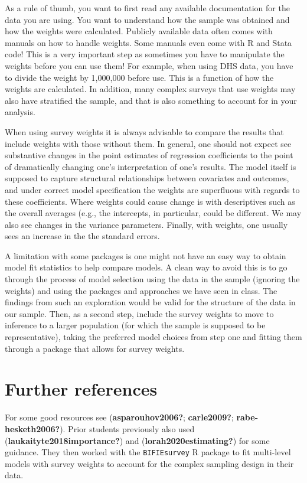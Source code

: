 \documentclass[
  letterpaper,
  DIV=11,
  numbers=noendperiod]{scrreprt}
\begin{document}
As a rule of thumb, you want to first read any available documentation
for the data you are using. You want to understand how the sample was
obtained and how the weights were calculated. Publicly available data
often comes with manuals on how to handle weights. Some manuals even
come with R and Stata code! This is a very important step as sometimes
you have to manipulate the weights before you can use them! For example,
when using DHS data, you have to divide the weight by 1,000,000 before
use. This is a function of how the weights are calculated. In addition,
many complex surveys that use weights may also have stratified the
sample, and that is also something to account for in your analysis.

When using survey weights it is always advisable to compare the results
that include weights with those without them. In general, one should not
expect see substantive changes in the point estimates of regression
coefficients to the point of dramatically changing one's interpretation
of one's results. The model itself is supposed to capture structural
relationships between covariates and outcomes, and under correct model
specification the weights are superfluous with regards to these
coefficients. Where weights could cause change is with descriptives such
as the overall averages (e.g., the intercepts, in particular, could be
different. We may also see changes in the variance parameters. Finally,
with weights, one usually sees an increase in the the standard errors.

A limitation with some packages is one might not have an easy way to
obtain model fit statistics to help compare models. A clean way to avoid
this is to go through the process of model selection using the data in
the sample (ignoring the weights) and using the packages and approaches
we have seen in class. The findings from such an exploration would be
valid for the structure of the data in our sample. Then, as a second
step, include the survey weights to move to inference to a larger
population (for which the sample is supposed to be representative),
taking the preferred model choices from step one and fitting them
through a package that allows for survey weights.

\hypertarget{further-references}{%
\section{Further references}\label{further-references}}

For some good resources see (\textbf{asparouhov2006?};
\textbf{carle2009?}; \textbf{rabe-hesketh2006?}). Prior students
previously also used (\textbf{laukaityte2018importance?}) and
(\textbf{lorah2020estimating?}) for some guidance. They then worked with
the \texttt{BIFIEsurvey} R package to fit multi-level models with survey
weights to account for the complex sampling design in their data.
\end{document}
